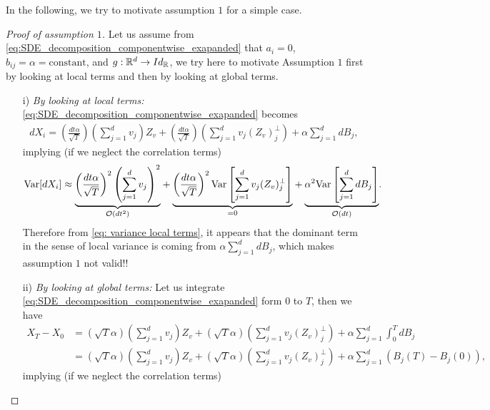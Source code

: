 In the following, we try to motivate assumption $1$ for a simple case.
\begin{proof}[Proof of assumption $1$]
Let us assume from \eqref{eq:SDE_decomposition_componentwise_exapanded} that $a_i=0$, $b_{ij}=\alpha=\text{constant}$, and $g:\mathbb{R}^d \rightarrow Id_{\mathbb{R}}$, we try here to motivate Assumption $1$ first by looking at local terms and then by looking at global terms.
\begin{itemize}
\item[i)] \textit{By looking at local terms:} \eqref{eq:SDE_decomposition_componentwise_exapanded} becomes
\begin{align*}
dX_i= \left( \frac{dt \alpha}{\sqrt{T}} \right) \left( \sum_{j=1}^d v_j \right) Z_v + \left( \frac{dt \alpha}{\sqrt{T}} \right) \left( \sum_{j=1}^d v_j (Z_v)^\perp_j \right) +\alpha \sum_{j=1}^d dB_j,
\end{align*}
implying (if we neglect the correlation terms)
\begin{align}\label{eq: variance local terms}
\text{Var}[dX_i]\approx \underset{{\mathcal{O}}\left(dt^2\right)}{\underbrace{\left( \frac{dt \alpha}{\sqrt{T}} \right)^2 \left( \sum_{j=1}^d v_j \right)^2}}  + \underset{=0}{\underbrace{\left( \frac{dt \alpha}{\sqrt{T}} \right)^2 \text{Var}\left[ \sum_{j=1}^d v_j (Z_v)^\perp_j  \right]}}+\underset{{\mathcal{O}}\left(dt\right)}{\underbrace{\alpha^2  \text{Var}\left[\sum_{j=1}^d dB_j \right]}}.
\end{align}
Therefore from \eqref{eq: variance local terms}, it appears that the dominant term in the sense of local variance is coming from $\alpha \sum_{j=1}^d dB_j$, which makes assumption $1$ not valid!!
\item[ii)] \textit{By looking at global terms:} Let us integrate \eqref{eq:SDE_decomposition_componentwise_exapanded} form $0$ to $T$, then we have
\begin{align*}
X_T-X_0 &= \left( \sqrt{T}\alpha \right) \left( \sum_{j=1}^d v_j \right) Z_v + \left( \sqrt{T} \alpha \right) \left( \sum_{j=1}^d v_j  (Z_v)^\perp_j \right)+\alpha \sum_{j=1}^d  \int_{0}^T dB_j \nonumber\\
&= \left( \sqrt{T}\alpha \right) \left( \sum_{j=1}^d v_j \right) Z_v + \left( \sqrt{T} \alpha \right) \left( \sum_{j=1}^d v_j  (Z_v)^\perp_j \right)+\alpha \sum_{j=1}^d  \left(B_j(T)-B_j(0)\right) ,
\end{align*}
implying (if we neglect the correlation terms)


\end{itemize}
\end{proof}
